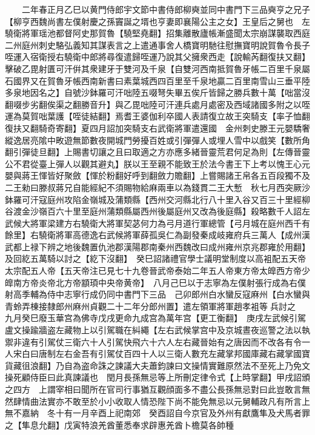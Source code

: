 　　二年春正月乙巳以黄門侍郎宇文節中書侍郎柳奭並同中書門下三品奭亨之兄子【柳亨西魏尚書左僕射慶之孫竇誕之壻也亨妻即襄陽公主之女】王皇后之舅也　左驍衛將軍瑶池都督阿史那賀魯【驍堅堯翻】招集離散廬帳漸盛聞太宗崩謀襲取西庭二州庭州刺史駱弘義知其謀表言之上遣通事舍人橋寶明馳往慰撫寶明說賀魯令長子咥運入宿衛授右驍衛中郎將尋復遣歸咥運乃說其父擁衆西走【說輸芮翻復扶又翻】擊破乙毘射匱可汗倂其衆建牙于雙河及千泉【自雙河西南抵賀魯牙帳二百里千泉屬石國界又在賀魯牙帳西南新書曰素葉城西四百里至千泉地贏二百里南雪山三垂平陸多泉地因名之】自號沙鉢羅可汗咄陸五啜弩失畢五俟斤皆歸之勝兵數十萬【咄當沒翻啜步劣翻俟渠之翻勝音升】與乙毘咄陸可汗連兵處月處密及西域諸國多附之以咥運為莫賀咄葉護【咥徒結翻】焉耆王婆伽利卒國人表請復立故王突騎支【率子恤翻復扶又翻騎奇寄翻】夏四月詔加突騎支右武衛將軍遣還國　金州刺史滕王元嬰驕奢縱逸居亮隂中畋遊無節數夜開城門勞擾百姓或引彈彈人或埋人雪中以戲笑【數所角翻引彈徒旦翻】上賜書切讓之且曰取適之方亦應多緒晉靈荒君何足為則【左傳晉靈公不君從臺上彈人以觀其避丸】朕以王至親不能致王於法今書王下上考以愧王心元嬰與蔣王惲皆好聚斂【惲於粉翻好呼到翻斂力贍翻】上嘗賜諸王帛各五百段獨不及二王勑曰滕叔蔣兄自能經紀不須賜物給麻兩車以為錢貫二王大慙　秋七月西突厥沙鉢羅可汗寇庭州攻陷金嶺城及蒲類縣【西州交河縣北行八十里入谷又百三十里經柳谷渡金沙嶺百六十里至庭州蒲類縣屬西州後屬庭州又改為後庭縣】殺略數千人詔左武候大將軍梁建方右驍衛大將軍契苾何力為弓月道行軍總管【弓月城在庭州西千有餘里】右驍衛將軍高德逸右武候將軍薛孤吳仁為副發秦成岐雍府兵三萬人【成州漢武都上禄下辨之地後魏置仇池郡漢陽郡南秦州西魏改曰成州雍州京兆郡雍於用翻】及回紇五萬騎以討之【紇下沒翻】　癸巳詔諸禮官學士議明堂制度以高袓配五天帝太宗配五人帝【五天帝注已見七十九卷晉武帝泰始二年五人帝東方帝太皥西方帝少皥南方帝炎帝北方帝顓頊中央帝黄帝】　八月己巳以于志寧為左僕射張行成為右僕射高季輔為侍中志寧行成仍同中書門下三品　己卯郎州白水蠻反寇麻州【白水蠻與青蛉弄棟接隸郎州麻州貞觀二十二年分郎州置】遣左領軍將軍趙孝袓等兵討之　九月癸巳廢玉華宫為佛寺戊戌更命九成宫為萬年宫【更工衡翻】　庚戌左武候引駕盧文操踰牆盗左藏物上以引駕職在糾繩【左右武候掌宫中及京城晝夜巡警之法以執禦非違有引駕仗三衛六十人引駕快飛六十六人左右藏晉始有之唐因而不改各有令一人宋白曰唐制左右金吾有引駕仗百四十人以三衛人數充左藏掌邦國庫藏右藏掌國寶貨藏徂浪翻】乃自為盗命誅之諫議大夫蕭鈞諫曰文操情實難原然法不至死上乃免文操死顧侍臣曰此真諫議也　閏月長孫無忌等上所刪定律令式【上時掌翻】甲戌詔頒之四方　上謂宰相曰聞所在官司行事猶互觀顔面多不盡公長孫無忌對曰此豈敢言無然肆情曲法實亦不敢至於小小收取人情恐陛下尚不能免無忌以元舅輔政凡有所言上無不嘉納　冬十有一月辛酉上祀南郊　癸酉詔自今京官及外州有獻鷹隼及犬馬者罪之【隼息允翻】戊寅特浪羌酋董悉奉求辟惠羌酋卜檐莫各帥種


